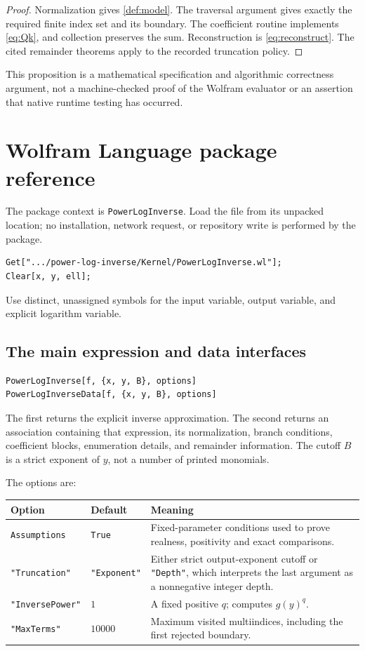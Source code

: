 \documentclass[11pt,a4paper]{article}
\theoremstyle{definition}
\theoremstyle{remark}
\newcommand{\code}[1]{\texttt{#1}}
\begin{document}
\begin{proof}
Normalization gives \cref{def:model}. The traversal argument gives exactly the
required finite index set and its boundary. The coefficient routine implements
\eqref{eq:Qk}, and collection preserves the sum. Reconstruction is
\eqref{eq:reconstruct}. The cited remainder theorems apply to the recorded
truncation policy.
\end{proof}

This proposition is a mathematical specification and algorithmic correctness
argument, not a machine-checked proof of the Wolfram evaluator or an assertion
that native runtime testing has occurred.

\section{Wolfram Language package reference}
\label{sec:api}

The package context is \code{PowerLogInverse\textasciigrave}. Load the file from its
unpacked location; no installation, network request, or repository write is
performed by the package.
\begin{lstlisting}
Get[".../power-log-inverse/Kernel/PowerLogInverse.wl"];
Clear[x, y, ell];
\end{lstlisting}
Use distinct, unassigned symbols for the input variable, output variable, and
explicit logarithm variable.

\subsection{The main expression and data interfaces}

\begin{lstlisting}
PowerLogInverse[f, {x, y, B}, options]
PowerLogInverseData[f, {x, y, B}, options]
\end{lstlisting}
The first returns the explicit inverse approximation. The second returns an
association containing that expression, its normalization, branch conditions,
coefficient blocks, enumeration details, and remainder information. The
cutoff $B$ is a strict exponent of $y$, not a number of printed monomials.

The options are:
\begin{center}
\begin{tabularx}{\textwidth}{@{}p{34mm}p{25mm}X@{}}
\toprule
Option & Default & Meaning\\\midrule
\code{Assumptions} & \code{True} & Fixed-parameter conditions used to prove realness, positivity and exact comparisons.\\
\code{"Truncation"} & \code{"Exponent"} & Either strict output-exponent cutoff or \code{"Depth"}, which interprets the last argument as a nonnegative integer depth.\\
\code{"InversePower"} & $1$ & A fixed positive $q$; computes $g(y)^q$.\\
\code{"MaxTerms"} & $10000$ & Maximum visited multiindices, including the first rejected boundary.\\
\bottomrule
\end{tabularx}
\end{center}
\end{document}
